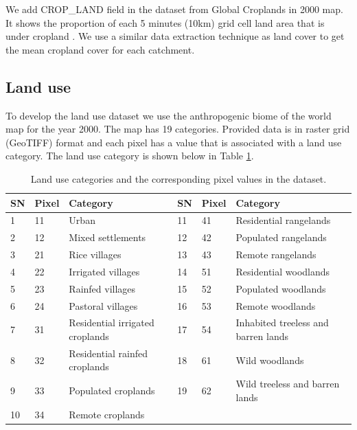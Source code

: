 \documentclass[a4paper, 12pt]{article}
\begin{document}
We add CROP\_LAND field in the dataset from Global Croplands in 2000 map. It shows the proportion of each 5 minutes (10km) grid cell land area that is under cropland \citep{ramankutty2010global}. We use a similar data extraction technique as land cover to get the mean cropland cover for each catchment.

\subsection{Land use}
To develop the land use dataset we use the anthropogenic biome of the world map for the year 2000. The map has 19 categories. Provided data is in raster grid (GeoTIFF) format and each pixel has a value that is associated with a land use category. The land use category is shown below in Table \ref{tab:lu}. 

\begin{table}[!h]
\begin{tabular}{llllll}
\hline
SN & Pixel & Category                        & SN & Pixel & Category                            \\ \hline
1  & 11    & Urban                           & 11 & 41    & Residential rangelands              \\
2  & 12    & Mixed settlements               & 12 & 42    & Populated rangelands                \\
3  & 21    & Rice villages                   & 13 & 43    & Remote rangelands                   \\
4  & 22    & Irrigated villages              & 14 & 51    & Residential woodlands               \\
5  & 23    & Rainfed villages                & 15 & 52    & Populated woodlands                 \\
6  & 24    & Pastoral villages               & 16 & 53    & Remote woodlands                    \\
7  & 31    & Residential irrigated croplands & 17 & 54    & Inhabited treeless and barren lands \\
8  & 32    & Residential rainfed croplands   & 18 & 61    & Wild woodlands                      \\
9  & 33    & Populated croplands             & 19 & 62    & Wild treeless and barren lands      \\
10 & 34    & Remote croplands                &    &       &                                     \\ \hline
\end{tabular}
\caption{Land use categories and the corresponding pixel values in the dataset.}
\label{tab:lu}
\end{table}
\end{document}
